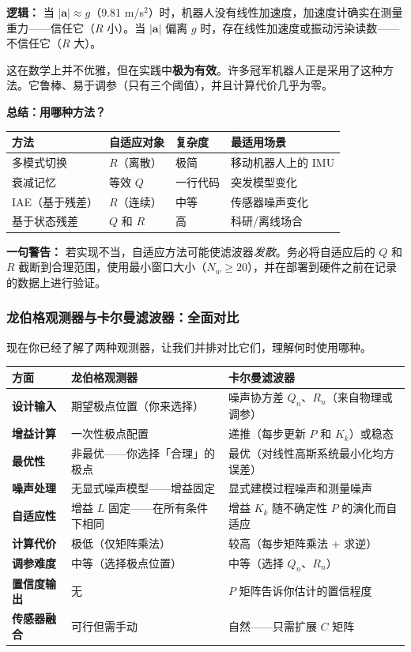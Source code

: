 \textbf{逻辑：} 当 $|\mathbf{a}| \approx g$（9.81 m/s$^2$）时，机器人没有线性加速度，加速度计确实在测量重力——信任它（$R$ 小）。当 $|\mathbf{a}|$ 偏离 $g$ 时，存在线性加速度或振动污染读数——不信任它（$R$ 大）。

这在数学上并不优雅，但在实践中\textbf{极为有效}。许多冠军机器人正是采用了这种方法。它鲁棒、易于调参（只有三个阈值），并且计算代价几乎为零。

\textbf{总结：用哪种方法？}

\begin{center}
\begin{tabular}{llll}
\toprule
\textbf{方法} & \textbf{自适应对象} & \textbf{复杂度} & \textbf{最适用场景} \\
\midrule
多模式切换 & $R$（离散） & 极简 & 移动机器人上的 IMU \\
衰减记忆 & 等效 $Q$ & 一行代码 & 突发模型变化 \\
IAE（基于残差） & $R$（连续） & 中等 & 传感器噪声变化 \\
基于状态残差 & $Q$ 和 $R$ & 高 & 科研/离线场合 \\
\bottomrule
\end{tabular}
\end{center}

\textbf{一句警告：} 若实现不当，自适应方法可能使滤波器\textit{发散}。务必将自适应后的 $Q$ 和 $R$ 截断到合理范围，使用最小窗口大小（$N_w \geq 20$），并在部署到硬件之前在记录的数据上进行验证。

\subsubsection{龙伯格观测器与卡尔曼滤波器：全面对比}

现在你已经了解了两种观测器，让我们并排对比它们，理解何时使用哪种。

\begin{center}
\begin{tabular}{p{3.5cm}p{5.5cm}p{5.5cm}}
\toprule
\textbf{方面} & \textbf{龙伯格观测器} & \textbf{卡尔曼滤波器} \\
\midrule
\textbf{设计输入} & 期望极点位置（你来选择） & 噪声协方差 $Q_n$、$R_n$（来自物理或调参） \\
\textbf{增益计算} & 一次性极点配置 & 递推（每步更新 $P$ 和 $K_k$）或稳态 \\
\textbf{最优性} & 非最优——你选择「合理」的极点 & 最优（对线性高斯系统最小化均方误差） \\
\textbf{噪声处理} & 无显式噪声模型——增益固定 & 显式建模过程噪声和测量噪声 \\
\textbf{自适应性} & 增益 $L$ 固定——在所有条件下相同 & 增益 $K_k$ 随不确定性 $P$ 的演化而自适应 \\
\textbf{计算代价} & 极低（仅矩阵乘法） & 较高（每步矩阵乘法 + 求逆） \\
\textbf{调参难度} & 中等（选择极点位置） & 中等（选择 $Q_n$、$R_n$） \\
\textbf{置信度输出} & 无 & $P$ 矩阵告诉你估计的置信程度 \\
\textbf{传感器融合} & 可行但需手动 & 自然——只需扩展 $C$ 矩阵 \\
\bottomrule
\end{tabular}
\end{center}

